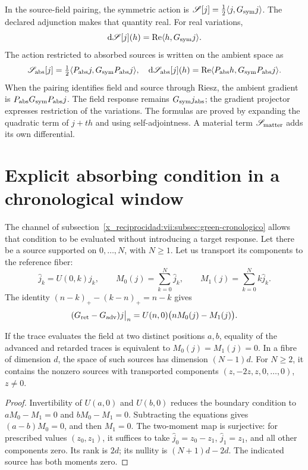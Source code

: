 In the source-field pairing, the symmetric action is
\(\mathscr S[j]=\tfrac12\langle j,G_{\rm sym}j\rangle\).
The declared adjunction makes that quantity real. For real variations,
\[
 \mathrm d\mathscr S[j](h)
 =\operatorname{Re}\langle h,G_{\rm sym}j\rangle.
\]
The action restricted to absorbed sources is written on the ambient
space as
\begin{equation}
 \mathscr S_{\rm abs}[j]
 =\tfrac12\langle P_{\rm abs}j,G_{\rm sym}P_{\rm abs}j\rangle,
 \quad
 \mathrm d\mathscr S_{\rm abs}[j](h)
 =\operatorname{Re}\langle P_{\rm abs}h,G_{\rm sym}P_{\rm abs}j\rangle.
 \label{x_reciprocidad:vii:eq:variacion-restringida-absorcion}
\end{equation}
When the pairing identifies field and source through Riesz, the ambient gradient
is \(P_{\rm abs}G_{\rm sym}P_{\rm abs}j\).
The field response remains \(G_{\rm sym}j_{\rm abs}\); the
gradient projector expresses restriction of the variations.
The formulas are proved by expanding the quadratic term of
\(j+th\) and using self-adjointness. A material term
\(\mathscr S_{\rm matter}\) adds its own differential.

\section{Explicit absorbing condition in a chronological window}
\label{x_reciprocidad:vii:subsec:absorcion-momentos}

The channel of subsection~\ref{x_reciprocidad:vii:subsec:green-cronologico} allows
that condition to be evaluated without introducing a target response. Let there be a
source supported on \(0,\ldots,N\), with \(N\geq1\). Let us transport
its components to the reference fiber:
\[
 \widehat j_k=U(0,k)j_k,\qquad
 M_0(j)=\sum_{k=0}^N\widehat j_k,\qquad
 M_1(j)=\sum_{k=0}^Nk\widehat j_k.
\]
The identity \((n-k)_+-(k-n)_+=n-k\) gives
\begin{equation}
 (G_{\rm ret}-G_{\rm adv})j\big|_n
 =U(n,0)\bigl(nM_0(j)-M_1(j)\bigr).
 \label{x_reciprocidad:vii:eq:diferencia-green-momentos}
\end{equation}

\begin{proposition}
\label{x_reciprocidad:vii:prop:absorcion-momentos}
If the trace evaluates the field at two distinct positions \(a,b\),
equality of the advanced and retarded traces is equivalent to
\(M_0(j)=M_1(j)=0\). In a fibre of dimension \(d\), the space
of such sources has dimension \((N-1)d\). For \(N\geq2\),
it contains the nonzero sources with transported components
\((z,-2z,z,0,\ldots,0)\), \(z\neq0\).
\end{proposition}
\begin{proof}
Invertibility of \(U(a,0)\) and \(U(b,0)\) reduces the boundary
condition to \(aM_0-M_1=0\) and \(bM_0-M_1=0\).
Subtracting the equations gives \((a-b)M_0=0\), and then \(M_1=0\).
The two-moment map is surjective: for prescribed values
\((z_0,z_1)\), it suffices to take
\(\widehat j_0=z_0-z_1\), \(\widehat j_1=z_1\), and all other
components zero. Its rank is \(2d\); its nullity is
\((N+1)d-2d\). The indicated source has both moments zero.
\end{proof}

